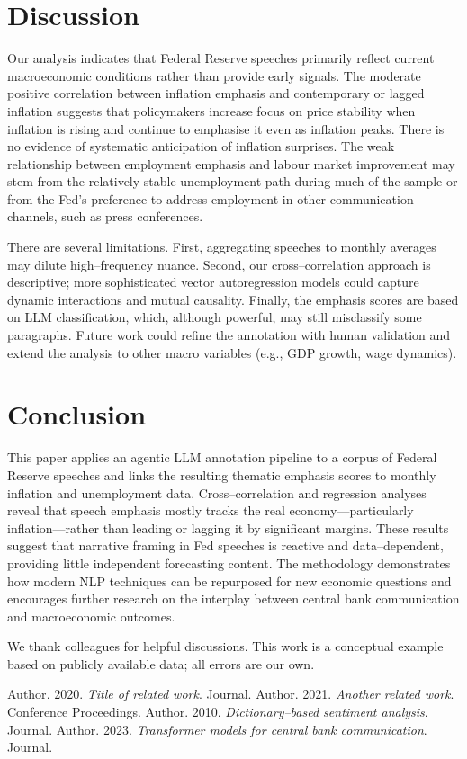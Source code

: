 \documentclass[sigconf]{acmart}
\begin{document}
\section{Discussion}

Our analysis indicates that Federal Reserve speeches primarily reflect current macroeconomic conditions rather than provide early signals.  The moderate positive correlation between inflation emphasis and contemporary or lagged inflation suggests that policymakers increase focus on price stability when inflation is rising and continue to emphasise it even as inflation peaks.  There is no evidence of systematic anticipation of inflation surprises.  The weak relationship between employment emphasis and labour market improvement may stem from the relatively stable unemployment path during much of the sample or from the Fed’s preference to address employment in other communication channels, such as press conferences.

There are several limitations.  First, aggregating speeches to monthly averages may dilute high–frequency nuance.  Second, our cross–correlation approach is descriptive; more sophisticated vector autoregression models could capture dynamic interactions and mutual causality.  Finally, the emphasis scores are based on LLM classification, which, although powerful, may still misclassify some paragraphs.  Future work could refine the annotation with human validation and extend the analysis to other macro variables (e.g., GDP growth, wage dynamics).

\section{Conclusion}

This paper applies an agentic LLM annotation pipeline to a corpus of Federal Reserve speeches and links the resulting thematic emphasis scores to monthly inflation and unemployment data.  Cross–correlation and regression analyses reveal that speech emphasis mostly tracks the real economy—particularly inflation—rather than leading or lagging it by significant margins.  These results suggest that narrative framing in Fed speeches is reactive and data–dependent, providing little independent forecasting content.  The methodology demonstrates how modern NLP techniques can be repurposed for new economic questions and encourages further research on the interplay between central bank communication and macroeconomic outcomes.

\begin{acks}
We thank colleagues for helpful discussions.  This work is a conceptual example based on publicly available data; all errors are our own.
\end{acks}

\begin{thebibliography}{9}
 {Author}. 2020. \textit{Title of related work}. Journal.
 {Author}. 2021. \textit{Another related work}. Conference Proceedings.
 {Author}. 2010. \textit{Dictionary–based sentiment analysis}. Journal.
 {Author}. 2023. \textit{Transformer models for central bank communication}. Journal.
\end{thebibliography}
\end{document}
